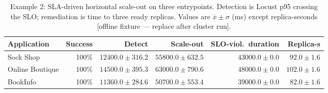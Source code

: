 \begin{table}[htbp]
\centering
\caption{Example 2: SLA-driven horizontal scale-out on three entrypoints. Detection is Locust p95 crossing the SLO; remediation is time to three ready replicas. Values are $\overline{x} \pm \sigma$ (ms) except replica-seconds [offline fixture --- replace after cluster run].}
\label{tab:paper_e2_scaling}
\footnotesize
\begin{tabular}{lrrrrr}
\toprule
\textbf{Application} & \textbf{Success} & \textbf{Detect} & \textbf{Scale-out} & \textbf{SLO-viol.\ duration} & \textbf{Replica-s} \\
\midrule
Sock Shop & 100\% & $12400.0 \pm 316.2$ & $55800.0 \pm 632.5$ & $43000.0 \pm 0.0$ & $92.0 \pm 1.6$ \\
Online Boutique & 100\% & $14500.0 \pm 395.3$ & $63000.0 \pm 790.6$ & $48000.0 \pm 0.0$ & $102.0 \pm 1.6$ \\
BookInfo & 100\% & $11360.0 \pm 284.6$ & $50700.0 \pm 553.4$ & $39000.0 \pm 0.0$ & $82.0 \pm 1.6$ \\
\bottomrule
\end{tabular}
\end{table}
